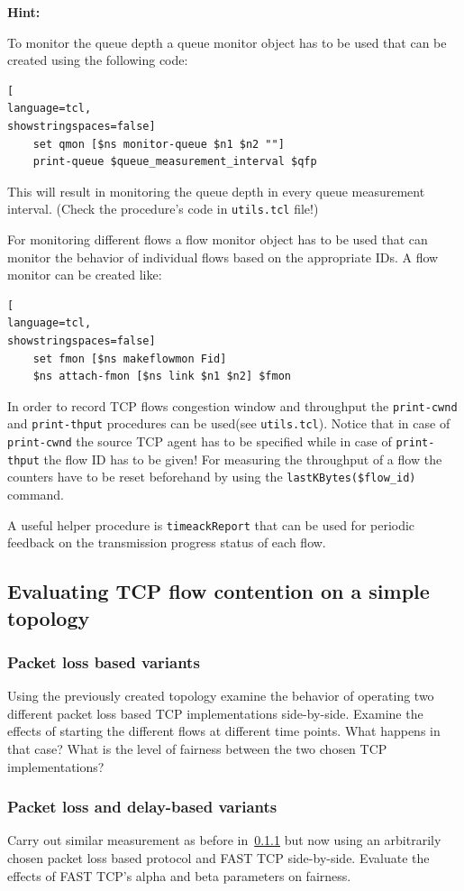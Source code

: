 \documentclass[a4paper]{article}
\begin{document}
\textbf{Hint:} \hfill \break

To monitor the queue depth a queue monitor object has to be used that can be created using the following code:

\begin{lstlisting}[
language=tcl,
showstringspaces=false]
    set qmon [$ns monitor-queue $n1 $n2 ""]
    print-queue $queue_measurement_interval $qfp
\end{lstlisting}

This will result in monitoring the queue depth in every queue measurement interval. (Check the procedure's code in
\verb!utils.tcl! file!)

For monitoring different flows a flow monitor object has to be used that can monitor the behavior of individual flows
based on the appropriate IDs.
A flow monitor can be created like:

\begin{lstlisting}[
language=tcl,
showstringspaces=false]
    set fmon [$ns makeflowmon Fid]
    $ns attach-fmon [$ns link $n1 $n2] $fmon
\end{lstlisting}

In order to record TCP flows congestion window and throughput the \verb!print-cwnd! and \verb!print-thput!
procedures can be used(see \verb!utils.tcl!).
Notice that in case of	\verb!print-cwnd! the source TCP agent has to be specified while in case of
\verb!print-thput! the flow ID has to be given!
For measuring the throughput of a flow the counters have to be reset beforehand by using the \verb!lastKBytes($flow_id)! command.

A useful helper procedure is \verb!timeackReport! that can be used for periodic feedback on
the transmission progress status of each flow.

\subsection{Evaluating TCP flow contention on a simple topology}

\subsubsection{Packet loss based variants}\label{sec:plossexercise}

Using the previously created topology examine the behavior of operating two different packet loss based
TCP implementations side-by-side. Examine the effects of starting the different flows at different time points.
What happens in that case? What is the level of fairness between the two chosen TCP implementations?

\subsubsection{Packet loss and delay-based variants}

Carry out similar measurement as before in~\ref{sec:plossexercise} but now using an arbitrarily chosen
packet loss based protocol and FAST TCP side-by-side. Evaluate the effects of FAST TCP's alpha and beta parameters on
fairness.
\end{document}

